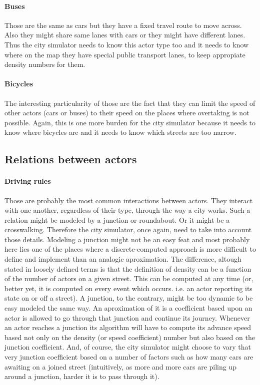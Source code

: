 \documentclass[a4paper,12pt,twoside]{book}
\begin{document}
\paragraph{Buses} Those are the same as cars but they have a fixed travel route to move across. Also they might share same lanes with cars or they might have different lanes. Thus the city simulator needs to know this actor type too and it needs to know where on the map they have special public transport lanes, to keep appropiate density numbers for them.
\paragraph{Bicycles} The interesting particularity of those are the fact that they can limit the speed of other actors (cars or buses) to their speed on the places where overtaking is not possible. Again, this is one more burden for the city simulator because it needs to know where bicycles are and it needs to know which streets are too narrow.

\subsection{Relations between actors}
\label{subsec:relationsbetweenactors}

\paragraph{Driving rules} Those are probably the most common interactions between actors. They interact with one another, regardless of their type, through the way a city works. Such a relation might be modeled by a junction or roundabout. Or it might be a crosswalking. Therefore the city simulator, once again, need to take into account those details. Modeling a junction might not be an easy feat and most probably here lies one of the places where a discrete-computed approach is more difficult to define and implement than an analogic aproximation. The difference, altough stated in loosely defined terms is that the definition of density can be a function of the number of actors on a given street. This can be computed at any time (or, better yet, it is computed on every event which occurs. i.e. an actor reporting its state on or off a street). A junction, to the contrary, might be too dynamic to be easy modeled the same way. An aproximation of it is a coefficient based upon an actor is allowed to go through that junction and continue its journey. Whenever an actor reaches a junction its algorithm will have to compute its advance speed based not only on the density (or speed coefficient) number but also based on the junction coefficient. And, of course, the city simulator might choose to vary that very junction coefficient based on a number of factors such as how many cars are awaiting on a joined street (intuitively, as more and more cars are piling up around a junction, harder it is to pass through it).
\end{document}
